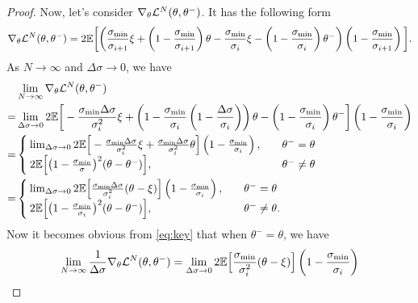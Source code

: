 \begin{proof}
Now, let's consider $\nabla_\theta \mathcal{L}^N(\theta, \theta^-)$. It has the following form
\begin{align*}
    \nabla_\theta \mathcal{L}^N(\theta, \theta^{-}) = 2\mathbb{E}\bigg[\bigg(\frac{\sigma_\text{min}}{\sigma_{i+1}}\xi + \left(1 - \frac{\sigma_\text{min}}{\sigma_{i+1}}\right)\theta - \frac{\sigma_\text{min}}{\sigma_i}\xi - \left(1 - \frac{\sigma_\text{min}}{\sigma_i}\right)\theta^-\bigg)\left(1 - \frac{\sigma_\text{min}}{\sigma_{i+1}}\right)\bigg].
\end{align*}
As $N\to\infty$ and $\Delta \sigma \to 0$, we have
\begin{align}
    &\lim_{N\to\infty}\nabla_\theta \mathcal{L}^N(\theta, \theta^{-}) \notag\\
    =& \lim_{\Delta \sigma \to 0} 2\mathbb{E}\bigg[-\frac{\sigma_\text{min}\Delta \sigma}{\sigma_i^2}\xi + \left(1 - \frac{\sigma_\text{min}}{\sigma_i}\left(1 - \frac{\Delta \sigma}{\sigma_i}\right)\right)\theta - \left(1 - \frac{\sigma_\text{min}}{\sigma_i}\right)\theta^-\bigg]\left(1 - \frac{\sigma_\text{min}}{\sigma_{i}}\right)\notag\\
    =& \begin{cases}
        \lim_{\Delta \sigma \to 0} 2\mathbb{E}\Big[-\frac{\sigma_\text{min}\Delta \sigma}{\sigma_i^2}\xi + \frac{\sigma_\text{min}\Delta \sigma}{\sigma_i^2}\theta \Big]\left(1 - \frac{\sigma_\text{min}}{\sigma_{i}}\right),\quad & \theta^- = \theta\\
        2\mathbb{E}\Big[ \big(1 - \frac{\sigma_\text{min}}{\sigma} \big)^2(\theta - \theta^{-})\Big], \quad &\theta^- \neq \theta
    \end{cases}\notag\\
    =& \begin{cases}
        \lim_{\Delta \sigma \to 0} 2\mathbb{E}\Big[\frac{\sigma_\text{min}\Delta \sigma}{\sigma_i^2}(\theta - \xi) \Big]\left(1 - \frac{\sigma_\text{min}}{\sigma_{i}}\right),\quad & \theta^- = \theta\\
        2\mathbb{E}\Big[ \big(1 - \frac{\sigma_\text{min}}{\sigma_i} \big)^2(\theta - \theta^{-})\Big], \quad &\theta^- \neq \theta.\label{eq:key}
    \end{cases}
\end{align}
Now it becomes obvious from \cref{eq:key} that when $\theta^- = \theta$, we have
\begin{align*}
    \lim_{N\to\infty}\frac{1}{\Delta \sigma} \nabla_\theta \mcal{L}^N(\theta, \theta^{-}) &= \lim_{\Delta \sigma \to 0} 2\mbb{E}\Big[\frac{\sigma_\text{min}}{\sigma_i^2}(\theta - \xi) \Big]\left(1 - \frac{\sigma_\text{min}}{\sigma_{i}}\right)\\

\end{align*}
\end{proof}

